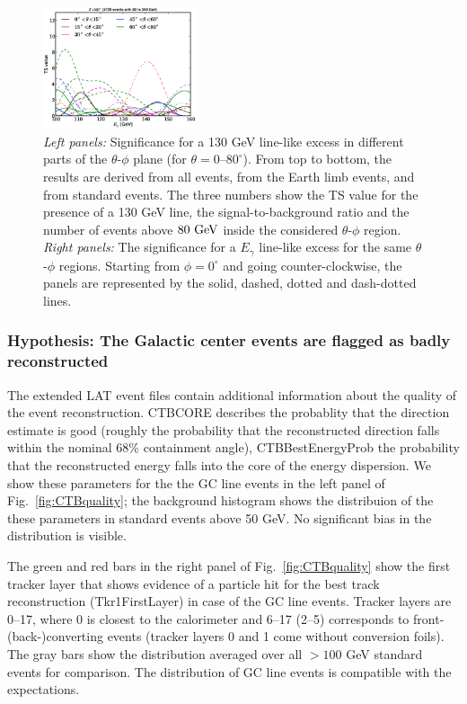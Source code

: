 \documentclass[aps,twocolumn,prd,superscriptaddress,showpacs,nofootinbib,fixfloat]{revtex4}
\newcommand{\GeV}{{\rm ~GeV}}
\begin{document}
\begin{figure}[p]
  \includegraphics[width=0.40\textwidth]{plots/scan_z.LE.100.eps}
  \caption{\emph{Left panels:} Significance for a 130 GeV line-like excess in different parts of
  the $\theta$-$\phi$ plane (for $\theta=0$--$80^\circ$). From top to bottom,
  the results are derived from all events, from the Earth limb events, and
  from standard events. The three numbers
  show the TS value for the presence of a 130 GeV line, the
  signal-to-background ratio and the number of events above $80\GeV$ inside
  the considered $\theta$-$\phi$ region. \emph{Right panels:} The significance
  for a $E_\gamma$ line-like excess for the same $\theta$-$\phi$ regions.
  Starting from $\phi=0^\circ$ and going counter-clockwise, the panels are
  represented by the solid, dashed, dotted and dash-dotted lines.}
  \label{fig:polarPlotsAll}
\end{figure}

\subsubsection{Hypothesis: The Galactic center events are flagged as badly
reconstructed}

The extended LAT event files contain additional information about the quality
of the event reconstruction. CTBCORE describes the probablity that the
direction estimate is good (roughly the probability that the reconstructed
direction falls within the nominal 68\% containment angle), CTBBestEnergyProb
the probability that the reconstructed energy falls into the core of the
energy dispersion. We show these parameters for the the GC line events in the
left panel of Fig.~\ref{fig:CTBquality}; the background histogram shows the
distribuion of the these parameters in standard events above 50 GeV. No
significant bias in the distribution is visible.

The green and red bars in the right panel of Fig.~\ref{fig:CTBquality} show
the first tracker layer that shows evidence of a particle hit for the best
track reconstruction (Tkr1FirstLayer) in case of the GC line events.  Tracker
layers are 0--17, where 0 is closest to the calorimeter and 6--17 (2--5)
corresponds to front- (back-)converting events (tracker layers 0 and 1 come
without conversion foils). The gray bars show the distribution averaged over
all $>100$ GeV standard events for comparison. The distribution of GC line
events is compatible with the expectations.
\end{document}
